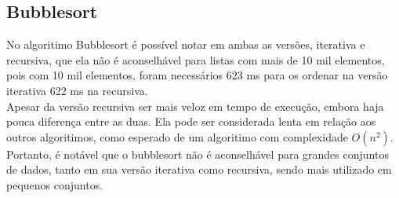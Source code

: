 \subsection{Bubblesort}
No algoritimo Bubblesort é possível notar em ambas as versões, iterativa e recursiva, que ela não é aconselhável para listas com mais de 10 mil elementos, pois com 10 mil elementos, foram necessários 623 ms para os ordenar na versão iterativa 622 ms na recursiva. \\

Apesar da versão recursiva ser mais veloz em tempo de execução, embora haja pouca diferença entre as duas. Ela pode ser considerada lenta em relação aos outros algoritimos, como esperado de um algoritimo com complexidade $O(n^2)$. \\

Portanto, é notável que o bubblesort não é aconselhável para grandes conjuntos de dados, tanto em sua versão iterativa como recursiva, sendo mais utilizado em pequenos conjuntos.